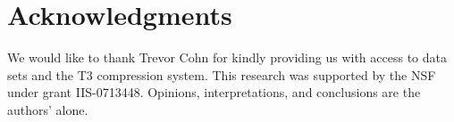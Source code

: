 \documentclass[11pt]{article}
\begin{document}
\newpage
\section*{Acknowledgments}
 We would like to thank Trevor Cohn for kindly providing us with
 access to data sets and the T3 compression system.
This research was supported by the NSF under grant IIS-0713448. Opinions, interpretations, and conclusions are the authors' alone.



\end{document}
